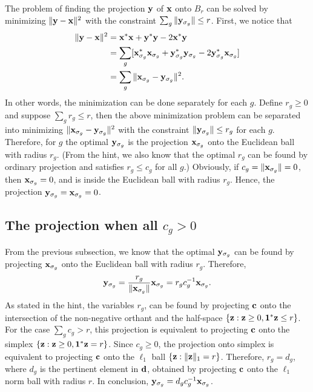 \documentclass{scrartcl}
\begin{document}
The problem of finding the projection $\mathbf{y}$ of $\mathbf{x}$ onto $B_r$ can be solved by minimizing $\|\mathbf{y}-\mathbf{x}\|^2$ with the
constraint $\sum_{g} \|\mathbf{y}_{\sigma_g}\| \le r$. First, we notice that
\begin{equation}
\begin{split}
\|\mathbf{y}-\mathbf{x}\|^2 & = \mathbf{x}^*\mathbf{x} + \mathbf{y}^*\mathbf{y} - 2 \mathbf{x}^*\mathbf{y} \\
& = \sum_{g} [ \mathbf{x}_{\sigma_g}^*\mathbf{x}_{\sigma_g} + \mathbf{y}_{\sigma_g}^*\mathbf{y}_{\sigma_g} - 2 \mathbf{y}_{\sigma_g}^*\mathbf{x}_{\sigma_g} ] \\
& = \sum_{g} \|\mathbf{x}_{\sigma_g} - \mathbf{y}_{\sigma_g}\|^2 .
\end{split}
\end{equation}
In other words, the minimization can be done separately for each $g$.
Define $r_g \ge 0$ and suppose $\sum_g r_g \le r$, then the above minimization problem can be separated into minimizing
$\|\mathbf{x}_{\sigma_g} - \mathbf{y}_{\sigma_g}\|^2$ with the constraint $\|\mathbf{y}_{\sigma_g}\| \le r_g$ for each $g$.
Therefore, for $g$ the optimal $\mathbf{y}_{\sigma_g}$ is the projection $\mathbf{x}_{\sigma_g}$ onto the Euclidean ball with radius $r_g$.
(From the hint, we also know that the optimal $r_g$ can be found by ordinary projection and satisfies $r_g \le c_g$ for all $g$.)
Obviously, if $c_g = \|\mathbf{x}_{\sigma_g}\| = 0$, then $\mathbf{x}_{\sigma_g} = 0$, and is inside the Euclidean ball with radius $r_g$.
Hence, the projection $\mathbf{y}_{\sigma_g} = \mathbf{x}_{\sigma_g} = 0$.

\subsection*{The projection when all $c_g > 0$}

From the previous subsection, we know that the optimal $\mathbf{y}_{\sigma_g}$ can be found by projecting $\mathbf{x}_{\sigma_g}$ onto the
Euclidean ball with radius $r_g$. Therefore,
\begin{equation}
\mathbf{y}_{\sigma_g} = {r_g \over \|\mathbf{x}_{\sigma_g}\|} \mathbf{x}_{\sigma_g} = r_g c_g^{-1} \mathbf{x}_{\sigma_g}.
\end{equation}
As stated in the hint, the variables $r_g$, can be found by projecting $\mathbf{c}$ onto the intersection of the non-negative
orthant and the half-space $\{\mathbf{z} :  \mathbf{z} \ge 0, \mathbf{1}^*\mathbf{z} \le r\}$. For the case $\sum_g c_g > r$, this projection is
equivalent to projecting $\mathbf{c}$ onto the simplex $\{\mathbf{z} :  \mathbf{z} \ge 0, \mathbf{1}^*\mathbf{z} = r\}$. Since $c_g \ge 0$,
the projection onto simplex is equivalent to projecting $\mathbf{c}$ onto the $\ell_1$ ball $\{\mathbf{z} : \|\mathbf{z}\|_1 = r\}$.
Therefore, $r_g = d_g$, where $d_g$ is the pertinent element in $\mathbf{d}$, obtained by projecting $\mathbf{c}$ onto the
$\ell_1$ norm ball with radius $r$. In conclusion, $\mathbf{y}_{\sigma_g} = d_g c_g^{-1}\mathbf{x}_{\sigma_g}$.
\end{document}
